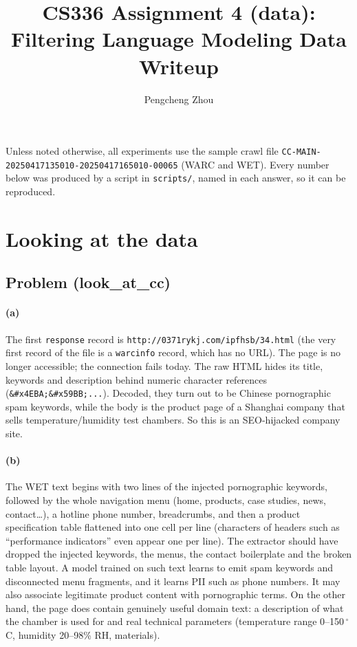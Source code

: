 \documentclass[11pt]{article}
\title{CS336 Assignment 4 (data): Filtering Language Modeling Data\\\large Writeup}
\author{Pengcheng Zhou}
\date{}
\begin{document}
\maketitle

\noindent Unless noted otherwise, all experiments use the sample crawl file
\texttt{CC-MAIN-20250417135010-20250417165010-00065} (WARC and WET). Every number
below was produced by a script in \texttt{scripts/}, named in each answer, so it can be reproduced.

\section{Looking at the data}

\subsection*{Problem (look\_at\_cc)}

\paragraph{(a)}
The first \texttt{response} record is \texttt{http://0371rykj.com/ipfhsb/34.html}
(the very first record of the file is a \texttt{warcinfo} record, which has no URL).
The page is no longer accessible; the connection fails today. The raw HTML
hides its title, keywords and description behind numeric character references
(\texttt{\&\#x4EBA;\&\#x59BB;...}). Decoded, they turn out to be Chinese pornographic
spam keywords, while the body is the product page of a Shanghai company that sells
temperature/humidity test chambers. So this is an SEO-hijacked company site.

\paragraph{(b)}
The WET text begins with two lines of the injected pornographic keywords, followed by the
whole navigation menu (home, products, case studies, news, contact\ldots), a hotline phone
number, breadcrumbs, and then a product specification table flattened into one cell per
line (characters of headers such as ``performance indicators'' even appear one per line).
The extractor should have dropped the injected keywords, the menus, the contact boilerplate
and the broken table layout. A model trained on such text learns to emit spam keywords and
disconnected menu fragments, and it learns PII such as phone numbers. It may also
associate legitimate product content with pornographic terms. On the other hand, the page
does contain genuinely useful domain text: a description of what the chamber is used for
and real technical parameters (temperature range 0--150\,$^\circ$C, humidity 20--98\% RH,
materials).
\end{document}
